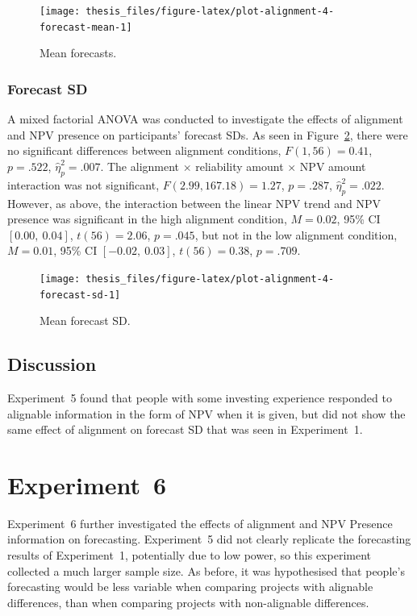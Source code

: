 \documentclass[a4paper, nobind, dvipsnames]{templates/ociamthesis}
\theoremstyle{definition}
\theoremstyle{definition}
\theoremstyle{definition}
\theoremstyle{definition}
\theoremstyle{remark}
\begin{document}
\begin{figure}
\texttt{[image: thesis\_files/figure-latex/plot-alignment-4-forecast-mean-1]} \caption{Mean forecasts.}\label{fig:plot-alignment-4-forecast-mean}
\end{figure}

\hypertarget{forecast-sd-alignment-4}{%
\subsubsection{Forecast SD}\label{forecast-sd-alignment-4}}

A mixed factorial ANOVA was conducted to investigate the effects of alignment
and NPV presence on participants' forecast SDs. As seen in
Figure~\ref{fig:plot-alignment-4-forecast-sd}, there were no significant
differences between alignment conditions,
\(F(1, 56) = 0.41\), \(p = .522\), \(\hat{\eta}^2_p = .007\). The alignment \(\times\)
reliability amount \(\times\) NPV amount interaction was not significant,
\(F(2.99, 167.18) = 1.27\), \(p = .287\), \(\hat{\eta}^2_p = .022\).
However, as above, the interaction between the linear NPV trend and NPV presence
was significant in the high alignment condition,
\(M = 0.02\), 95\% CI \([0.00,~0.04]\), \(t(56) = 2.06\), \(p = .045\), but not in the
low alignment condition, \(M = 0.01\), 95\% CI \([-0.02,~0.03]\), \(t(56) = 0.38\), \(p = .709\).



\begin{figure}
\texttt{[image: thesis\_files/figure-latex/plot-alignment-4-forecast-sd-1]} \caption{Mean forecast SD.}\label{fig:plot-alignment-4-forecast-sd}
\end{figure}

\subsection{Discussion}

Experiment~5 found that people with some investing experience responded to
alignable information in the form of NPV when it is given, but did not show the
same effect of alignment on forecast SD that was seen in Experiment~1.

\section{Experiment~6}

Experiment~6 further investigated the effects of alignment and NPV Presence
information on forecasting. Experiment~5 did not clearly replicate the
forecasting results of Experiment~1, potentially due to low power, so this
experiment collected a much larger sample size. As before, it was hypothesised
that people's forecasting would be less variable when comparing projects with
alignable differences, than when comparing projects with non-alignable
differences.
\end{document}
